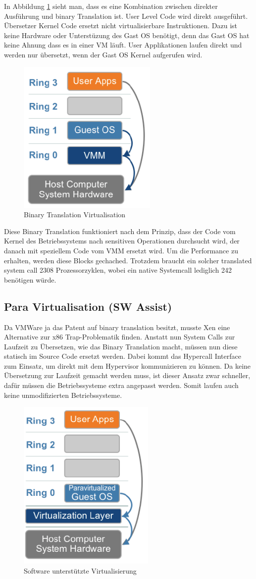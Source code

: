 In Abbildung \ref{fig:binary-translation-virt} sieht man, dass es eine Kombination zwischen direkter Ausführung und binary Translation ist. User Level Code wird direkt ausgeführt. Übersetzer Kernel Code ersetzt nicht virtualisierbare Instruktionen. Dazu ist keine Hardware oder Unterstüzung des Gast OS benötigt, denn das Gast OS hat keine Ahnung dass es in einer VM läuft. User Applikationen laufen direkt und werden nur übersetzt, wenn der Gast OS Kernel aufgerufen wird.

\begin{figure}[h!]
	\centering
	\includegraphics[width=0.3\linewidth]{fig/binary-translation-virt}
	\caption{Binary Translation Virtualisation}
	\label{fig:binary-translation-virt}
\end{figure}

Diese Binary Translation funktioniert nach dem Prinzip, dass der Code vom Kernel des Betriebssystems nach sensitiven Operationen durchsucht wird, der danach mit speziellem Code vom VMM ersetzt wird. Um die Performance zu erhalten, werden diese Blocks gechached. Trotzdem braucht ein solcher translated system call 2308 Prozessorzyklen, wobei ein native Systemcall lediglich 242 benötigen würde.

\subsection{Para Virtualisation (SW Assist)}
Da VMWare ja das Patent auf binary translation besitzt, musste Xen eine Alternative zur x86 Trap-Problematik finden. Anstatt nun System Calls zur Laufzeit zu Übersetzen, wie das Binary Translation macht, müssen nun diese statisch im Source Code ersetzt werden. Dabei kommt das Hypercall Interface zum Einsatz, um direkt mit dem Hypervisor kommunizieren zu können. Da keine Übersetzung zur Laufzeit gemacht werden muss, ist dieser Ansatz zwar schneller, dafür müssen die Betriebssysteme extra angepasst werden. Somit laufen auch keine unmodifizierten Betriebssysteme.
\begin{figure}[h!]
\centering
\includegraphics[width=0.2\linewidth]{fig/sw-virtualisierung-ringe}
\caption{Software unterstützte Virtualisierung}
\label{fig:sw-virtualisierung-ringe}
\end{figure}

